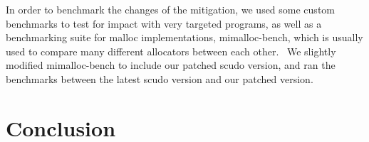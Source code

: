 \documentclass[a4paper,11pt,oneside]{report}
\begin{document}
In order to benchmark the changes of the mitigation, we used some custom benchmarks
to test for impact with very targeted programs, as well as a benchmarking suite
for malloc implementations, mimalloc-bench, which is usually used to compare many
different allocators between each other.~\cite{mimalloc-bench} We slightly modified
mimalloc-bench to include our patched scudo version, and ran the benchmarks between
the latest scudo version and our patched version.


\chapter{Conclusion}



\cleardoublepage{}
\printbibliography{}
\end{document}
